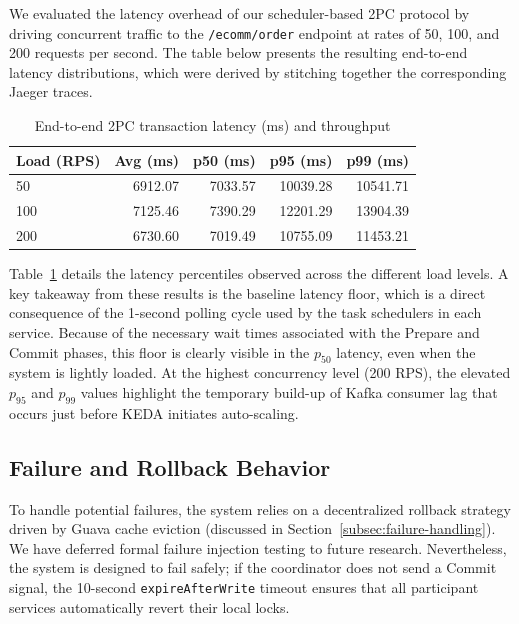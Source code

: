 \documentclass[]{USG}
\begin{document}
We evaluated the latency overhead of our scheduler-based 2PC protocol by 
driving concurrent traffic to the \texttt{/ecomm/order} endpoint at rates 
of 50, 100, and 200 requests per second.
%
The table below presents the resulting end-to-end latency distributions, 
which were derived by stitching together the corresponding Jaeger traces.

\begin{table}[htbp]
  \caption{End-to-end 2PC transaction latency (ms) and throughput}
  \label{tab:latency-results}
  \centering
  \begin{tabular}{lrrrr}
    \toprule
    \textbf{Load (RPS)} & \textbf{Avg (ms)} & \textbf{p50 (ms)} & \textbf{p95 (ms)} & \textbf{p99 (ms)} \\
    \midrule
    50   & 6912.07 & 7033.57 & 10039.28 & 10541.71 \\
    100  & 7125.46 & 7390.29 & 12201.29 & 13904.39 \\
    200  & 6730.60 & 7019.49 & 10755.09 & 11453.21 \\
    \bottomrule
  \end{tabular}
\end{table}

Table~\ref{tab:latency-results} details the latency percentiles observed across the different load levels.
%
A key takeaway from these results is the baseline latency floor, which is a
direct consequence of the 1-second polling cycle used by the task schedulers
in each service.
%
Because of the necessary wait times associated with the Prepare and Commit
phases, this floor is clearly visible in the $p_{50}$ latency, even when the
system is lightly loaded.
%
At the highest concurrency level (200 RPS), the elevated $p_{95}$ and $p_{99}$
values highlight the temporary build-up of Kafka consumer lag that occurs just
before KEDA initiates auto-scaling.

\subsection{Failure and Rollback Behavior}
\label{subsec:failure-results}
To handle potential failures, the system relies on a decentralized rollback
strategy driven by Guava cache eviction (discussed in
Section~\ref{subsec:failure-handling}).
%
We have deferred formal failure injection testing to future research.
%
Nevertheless, the system is designed to fail safely; if the coordinator does
not send a Commit signal, the 10-second \texttt{expireAfterWrite} timeout
ensures that all participant services automatically revert their local locks.
\end{document}
